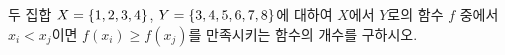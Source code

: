 두 집합 $X=\{1{,}\mkern3mu\mathopen{}2{,}\mkern3mu\mathopen{}3{,}\mkern3mu\mathopen{}4\}$, $Y=\{3{,}\mkern3mu\mathopen{}4{,}\mkern3mu\mathopen{}5{,}\mkern3mu\mathopen{}6{,}\mkern3mu\mathopen{}7{,}\mkern3mu\mathopen{}8\}$에 대하여 $X$에서 $Y$로의 함수 $f$ 중에서 $x_i<x_j$이면 $f(x_i)\ge f(x_j)$를 만족시키는 함수의 개수를 구하시오. 
